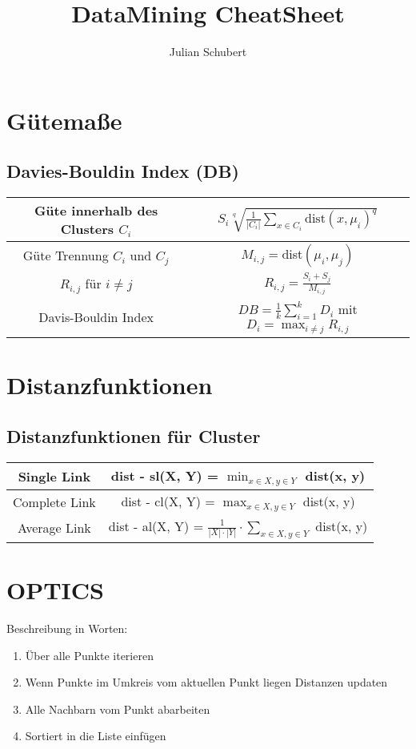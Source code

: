 \documentclass[14pt]{article}
\title{DataMining CheatSheet}
\author{Julian Schubert}
\begin{document}
\maketitle

\section{Gütemaße}
\subsection{Davies-Bouldin Index (DB)}
    \begin{tabular}{| c | c |}
        \hline
        Güte innerhalb des Clusters $C_i$ 
            & $S_i \sqrt[q]{\frac{1}{|C_i|} \sum_{x \in C_i}\text{dist}(x, \mu_i)^q}$ \\
        \hline
        Güte Trennung $C_i$ und $C_j$
            & $M_{i,j} = $dist$(\mu_i, \mu_j)$ \\
        \hline
        $R_{i,j}$ für $i \neq j$
            & $R_{i, j} = \frac{S_i + S_j}{M_{i, j}}$ \\
        \hline
        Davis-Bouldin Index
            & $DB = \frac{1}{k} \sum_{i = 1}^k D_i$ mit $D_i = \max_{i \neq j} R_{i,j}$ \\
        \hline
    \end{tabular}
\section{Distanzfunktionen}
\subsection{Distanzfunktionen für Cluster}
    \begin{tabular}{| c | c |}
        \hline
        Single Link 
            & dist - sl(X, Y) = $\min_{x \in X, y \in Y}$ dist(x, y) \\
        \hline
        Complete Link
            & dist - cl(X, Y) = $\max_{x \in X, y \in Y}$ dist(x, y) \\
        \hline
        Average Link
            & dist - al(X, Y) = $\frac{1}{|X| \cdot |Y|} \cdot \sum_{x \in X, y\in Y}$ dist(x, y) \\
        \hline
    \end{tabular}

\section{OPTICS}
Beschreibung in Worten: 
\begin{enumerate}
    \item Über alle Punkte iterieren
    \item Wenn Punkte im Umkreis vom aktuellen Punkt liegen Distanzen updaten
    \item Alle Nachbarn vom Punkt abarbeiten
    \item Sortiert in die Liste einfügen
\end{enumerate}
\end{document}
